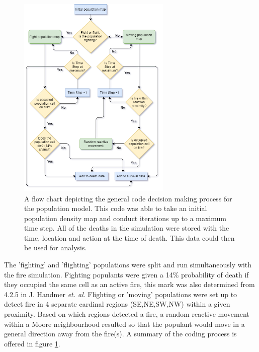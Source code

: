 \begin{figure}[h!]
    \centering
    \includegraphics[width=0.65\textwidth]{Figures/population_flow.png}
    \caption{A flow chart depicting the general code decision making process for the population model. This code was able to take an initial population density map and conduct iterations up to a maximum time step. All of the deaths in the simulation were stored with the time, location and action at the time of death. This data could then be used for analysis.}
    \label{population_flow}
\end{figure}

The 'fighting' and 'flighting' populations were split and run simultaneously with the fire simulation. Fighting populants were given a 14\% probability of death if they occupied the same cell as an active fire, this mark was also determined from 4.2.5 in J. Handmer \textit{et. al}. Flighting or 'moving' populations were set up to detect fire in 4 separate cardinal regions (SE,NE,SW,NW) within a given proximity. Based on which regions detected a fire, a random reactive movement within a Moore neighbourhood resulted so that the populant would move in a general direction away from the fire(s). A summary of the coding process is offered in figure \ref{population_flow}.

